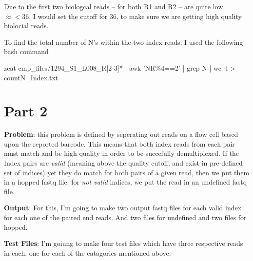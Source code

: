 \documentclass{article}
\begin{document}
\begin{enumerate}
\begin{description}
     \item

    Due to the first two biologcal reads -- for both R1 and R2 -- 
    are quite low $\approx < 36$, I would set the cutoff for 36, to make 
    sure we are getting high quality biolocial reads.

    \newpage
    \item

    To find the total number of N's within the two index reads, 
    I used the following bash command


    zcat emp\_files/1294\_S1\_L008\_R[2-3]* | awk 'NR\%4==2' | grep N | wc -l > countN\_Index.txt

\end{description}
\end{enumerate}

\section*{Part 2}

\textbf{Problem}: this problem is defined by seperating out reads on a flow cell based upon
the reported barcode. This means that both index reads from each pair must match and be high
quality in order to be succefully demultiplexed. 
If the Index pairs are 
\textit{valid} (meaning above the quality cutoff, and exist in pre-defined set of indices)  
yet they do match for both pairs of a given read, then we put them in a hopped fastq file.
for \textit{not valid} indices, we put the read in an undefined fastq file.

\textbf{Output}: For this, I'm going to make two output fastq files for each valid index 
for each one of the paired end reads. And two files for undefined and two files for hopped.

\textbf{Test Files}: I'm goiung to make four test files which have three respective reads 
in each, one for each of the catagories mentioned above. 







 
\end{document}
